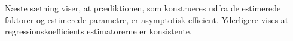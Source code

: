 %
Næste sætning viser, at prædiktionen, som konstrueres udfra de estimerede faktorer og estimerede parametre, er asymptotisk efficient.
Yderligere vises at regressionskoefficients estimatorerne er konsistente.

